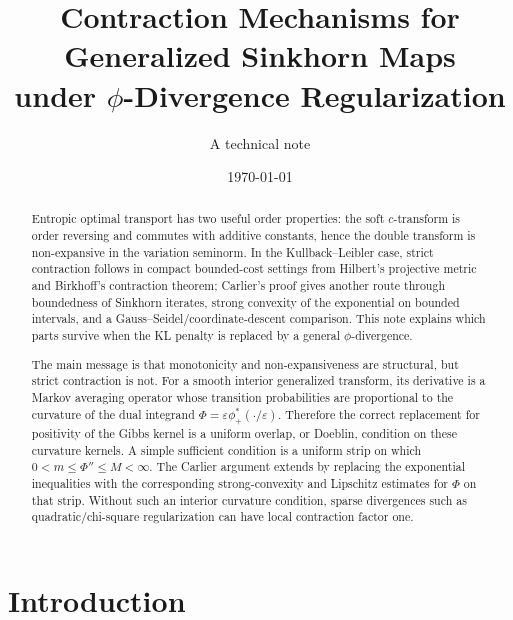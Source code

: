 \documentclass[11pt]{article}
\title{Contraction Mechanisms for Generalized Sinkhorn Maps\\
       under \texorpdfstring{$\phi$}{phi}-Divergence Regularization}
\author{A technical note}
\date{\today}
\newcommand{\eps}{\varepsilon}
\begin{document}
\maketitle

\begin{abstract}
Entropic optimal transport has two useful order properties: the soft
$c$-transform is order reversing and commutes with additive constants, hence
the double transform is non-expansive in the variation seminorm.  In the
Kullback--Leibler case, strict contraction follows in compact bounded-cost
settings from Hilbert's projective metric and Birkhoff's contraction theorem;
Carlier's proof gives another route through boundedness of Sinkhorn iterates,
strong convexity of the exponential on bounded intervals, and a
Gauss--Seidel/coordinate-descent comparison.  This note explains which parts
survive when the KL penalty is replaced by a general $\phi$-divergence.

The main message is that monotonicity and non-expansiveness are structural,
but strict contraction is not.  For a smooth interior generalized transform,
its derivative is a Markov averaging operator whose transition probabilities
are proportional to the curvature of the dual integrand
$\Phi=\eps\phi_+^*(\cdot/\eps)$.  Therefore the correct replacement for
positivity of the Gibbs kernel is a uniform overlap, or Doeblin, condition on
these curvature kernels.  A simple sufficient condition is a uniform strip on
which $0<m\leq \Phi''\leq M<\infty$.  The Carlier argument extends by replacing
the exponential inequalities with the corresponding strong-convexity and
Lipschitz estimates for $\Phi$ on that strip.  Without such an interior
curvature condition, sparse divergences such as quadratic/chi-square
regularization can have local contraction factor one.
\end{abstract}

\tableofcontents

\section{Introduction}
\end{document}
